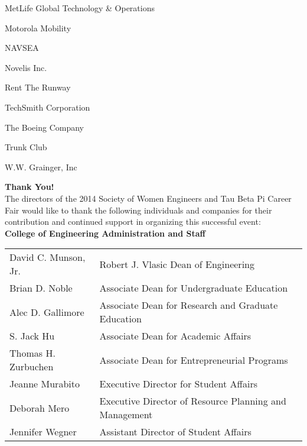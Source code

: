\documentclass[twoside]{article}
\begin{document}
\begin{center}
\begin{multicols}{5}
\begin{FlushLeft}
\begin{compactitem}
\item MetLife Global Technology \& Operations
\item Motorola Mobility
\item NAVSEA
\item Novelis Inc.
\item Rent The Runway
\item TechSmith Corporation
\item The Boeing Company
\item Trunk Club
\item W.W. Grainger, Inc
\end{compactitem}
        \end{FlushLeft}
        \vspace{1em}
        \end{multicols}\end{center}
    \startforewardsection
    { \fontsize{16}{19}\selectfont \bf Thank You!}\\The directors of the 2014 Society of Women Engineers 
    and Tau Beta Pi Career Fair would like to thank the following individuals and 
    companies for their contribution and continued support in organizing this 
    successful event:\\
    
    { \fontsize{14}{17}\selectfont \bf College of Engineering Administration and Staff}\\\begin{tabular}{p{2in}l}
    David C. Munson, Jr.	&	Robert J. Vlasic Dean of Engineering\\
        Brian D. Noble	&	Associate Dean for Undergraduate Education\\
        Alec D. Gallimore	&	Associate Dean for Research and Graduate Education\\
        S. Jack Hu	&	Associate Dean for Academic Affairs\\
        Thomas H. Zurbuchen	&	Associate Dean for Entrepreneurial Programs\\
        Jeanne  Murabito	&	Executive Director for Student Affairs\\
        Deborah Mero	&	Executive Director of Resource Planning and Management\\
        Jennifer Wegner	&	Assistant Director of Student Affairs\\
        \end{tabular}\\[1em]
    
\end{document}
